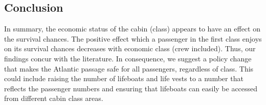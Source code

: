 \documentclass[
]{article}
\begin{document}
\hypertarget{conclusion}{%
\subsection{Conclusion}\label{conclusion}}

In summary, the economic status of the cabin (class) appears to have an
effect on the survival chances. The positive effect which a passenger in
the first class enjoys on its survival chances decreases with economic
class (crew included). Thus, our findings concur with the literature. In
consequence, we suggest a policy change that makes the Atlantic passage
safe for all passengers, regardless of class. This could include raising
the number of lifeboats and life vests to a number that reflects the
passenger numbers and ensuring that lifeboats can easily be accessed
from different cabin class areas.
\end{document}
